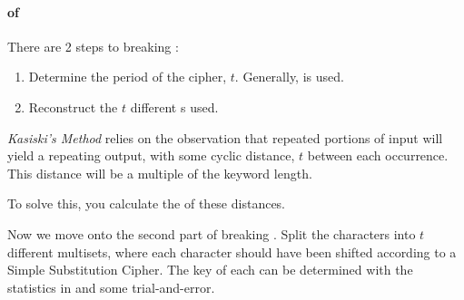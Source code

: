 \paragraph{ of }\label{par:Cryptanalysis_Vigenere_Cipher}
There are 2 steps to breaking :
\begin{enumerate}[noitemsep]
\item Determine the period of the cipher, $t$. Generally,  is used.
\item Reconstruct the $t$ different  s used.
\end{enumerate}

\begin{definition}\label{def:Kasiskis_Method}
  \emph{Kasiski's Method} relies on the observation that repeated portions of  input will yield a repeating  output, with some cyclic distance, $t$ between each occurrence.
  This distance will be a multiple of the keyword length.

  To solve this, you calculate the  of these distances.
\end{definition}

Now we move onto the second part of breaking .
Split the  characters into $t$ different multisets, where each character should have been shifted according to a Simple Substitution Cipher.
The key of each  can be determined with the statistics in  and some trial-and-error.
